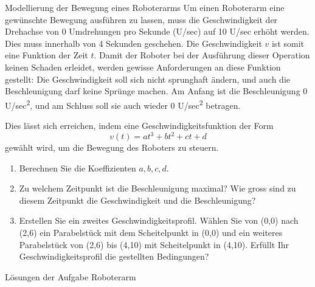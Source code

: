 \clearpage
\begin{ueb}
	{Modellierung der Bewegung eines Roboterarms}{}
	Um einen Roboterarm eine gewünschte Bewegung ausführen zu lassen, muss die Geschwindigkeit der Drehachse von 0 Umdrehungen pro Sekunde (U/sec) auf 10 U/sec erhöht werden. Dies muss innerhalb von 4 Sekunden geschehen. Die Geschwindigkeit $v$ ist somit eine Funktion der Zeit $t$. Damit der Roboter bei der Ausführung dieser Operation keinen Schaden erleidet, werden gewisse Anforderungen an diese Funktion gestellt: Die Geschwindigkeit soll sich nicht sprunghaft ändern, und auch die Beschleunigung darf keine Sprünge machen. Am Anfang ist die Beschleunigung 0 U/sec\textsuperscript{2}, und am Schluss soll sie auch wieder 0 U/sec\textsuperscript{2} betragen.

	Dies lässt sich erreichen, indem eine Geschwindigkeitsfunktion der Form
	\[v(t)=at^3+bt^2+ct+d\]
	gewählt wird, um die Bewegung des Roboters zu steuern.
	\begin{enumerate}
		\item Berechnen Sie die Koeffizienten $a,b,c,d$.
		\item Zu welchem Zeitpunkt ist die Beschleunigung maximal? Wie gross sind zu diesem Zeitpunkt die Geschwindigkeit und die Beschleunigung?
		\item Erstellen Sie ein zweites Geschwindigkeitsprofil. Wählen Sie von
		      (0,0) nach (2,6) ein Parabelstück mit dem Scheitelpunkt in (0,0) und ein weiteres Parabelstück von (2,6) bis (4,10) mit Scheitelpunkt in (4,10). Erfüllt Ihr Geschwindigkeitsprofil die gestellten Bedingungen?
	\end{enumerate}




\end{ueb}
\pagebreak
Lösungen der Aufgabe \glqq Roboterarm\grqq{}
